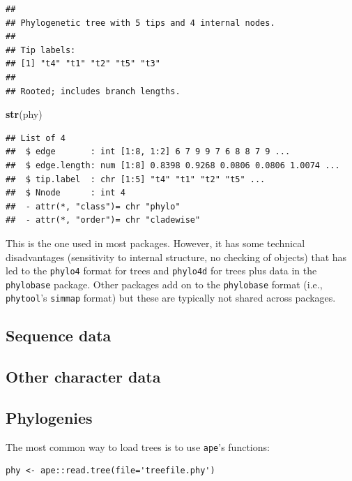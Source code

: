 \documentclass[]{article}
\newenvironment{Shaded}{\begin{snugshade}}{\end{snugshade}}
\newcommand{\KeywordTok}[1]{\textcolor[rgb]{0.13,0.29,0.53}{\textbf{#1}}}
\newcommand{\NormalTok}[1]{#1}
\begin{document}
\begin{verbatim}
## 
## Phylogenetic tree with 5 tips and 4 internal nodes.
## 
## Tip labels:
## [1] "t4" "t1" "t2" "t5" "t3"
## 
## Rooted; includes branch lengths.
\end{verbatim}

\begin{Shaded}
\begin{Highlighting}[]
\KeywordTok{str}\NormalTok{(phy)}
\end{Highlighting}
\end{Shaded}

\begin{verbatim}
## List of 4
##  $ edge       : int [1:8, 1:2] 6 7 9 9 7 6 8 8 7 9 ...
##  $ edge.length: num [1:8] 0.8398 0.9268 0.0806 0.0806 1.0074 ...
##  $ tip.label  : chr [1:5] "t4" "t1" "t2" "t5" ...
##  $ Nnode      : int 4
##  - attr(*, "class")= chr "phylo"
##  - attr(*, "order")= chr "cladewise"
\end{verbatim}

This is the one used in most packages. However, it has some technical disadvantages (sensitivity to internal structure, no checking of objects) that has led to the \texttt{phylo4} format for trees and \texttt{phylo4d} for trees plus data in the \texttt{phylobase} package. Other packages add on to the \texttt{phylobase} format (i.e., \texttt{phytool}'s \texttt{simmap} format) but these are typically not shared across packages.

\hypertarget{sequence-data}{%
\subsection{Sequence data}\label{sequence-data}}

\hypertarget{other-character-data}{%
\subsection{Other character data}\label{other-character-data}}

\hypertarget{phylogenies}{%
\subsection{Phylogenies}\label{phylogenies}}

The most common way to load trees is to use \texttt{ape}'s functions:

\begin{verbatim}
phy <- ape::read.tree(file='treefile.phy')
\end{verbatim}
\end{document}
